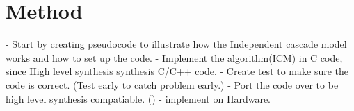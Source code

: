 \chapter{Method} \label{methode}
- Start by creating pseudocode to illustrate how the Independent cascade model works and how to set up the code.
- Implement the algorithm(ICM) in C code, since High level synthesis synthesis C/C++ code. 
- Create test to make sure the code is correct. (Test early to catch problem early.)
- Port the code over to be high level synthesis compatiable. () 
- implement on Hardware.
